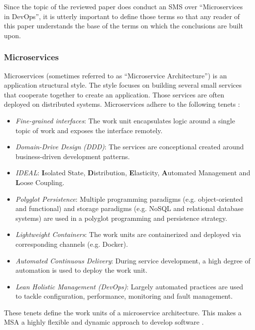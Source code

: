 Since the topic of the reviewed paper does conduct an SMS over ``Microservices in DevOps'',
it is utterly important to define those terms so that any reader of this paper
understands the base of the terms on which the conclusions are built upon.

\subsubsection{Microservices}

Microservices (sometimes referred to as ``Microservice Architecture'') is an application
structural style. The style focuses on building several small services that cooperate
together to create an application. Those services are often deployed on distributed
systems. Microservices adhere to the following tenets \cite{zio:MSATenets}:

\begin{itemize}
    \item \textit{Fine-grained interfaces}: The work unit encapsulates logic
    around a single topic of work and exposes the interface remotely.
    \item \textit{Domain-Drive Design (DDD)}: The services are conceptional
    created around business-driven development patterns.
    \item \textit{IDEAL}: \textbf{I}solated State, \textbf{D}istribution,
    \textbf{E}lasticity, \textbf{A}utomated Management and \textbf{L}oose Coupling.
    \item \textit{Polyglot Persistence}: Multiple programming paradigms (e.g.
    object-oriented and functional) and storage paradigms (e.g. NoSQL and relational
    database systems) are used in a polyglot programming and persistence strategy.
    \item \textit{Lightweight Containers}: The work units are containerized and
    deployed via corresponding channels (e.g. Docker).
    \item \textit{Automated Continuous Delivery}: During service development,
    a high degree of automation is used to deploy the work unit.
    \item \textit{Lean Holistic Management (DevOps)}: Largely automated practices
    are used to tackle configuration, performance, monitoring and fault management.
\end{itemize}

These tenets define the work units of a microservice architecture. This makes
a MSA a highly flexible and dynamic approach to develop software \cite{zio:MSATenets}.

